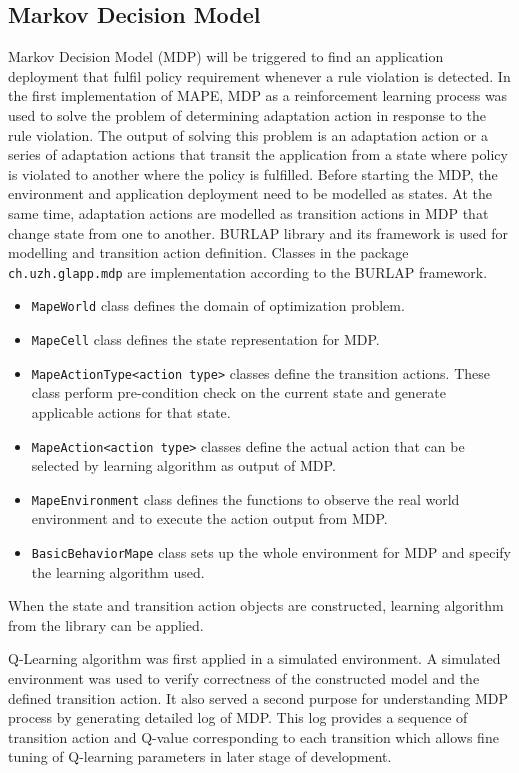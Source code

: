 \documentclass{seal_thesis}
\begin{document}
\subsection{Markov Decision Model}\label{sec:mdp}
Markov Decision Model (MDP) will be triggered to find an application deployment that fulfil policy requirement whenever a rule violation is detected.
In the first implementation of MAPE, MDP as a reinforcement learning process was used to solve the problem of determining adaptation action in response to the rule violation.
The output of solving this problem is an adaptation action or a series of adaptation actions that transit the application from a state where policy is violated to another where the policy is fulfilled.
Before starting the MDP, the environment and application deployment need to be modelled as states.
At the same time, adaptation actions are modelled as transition actions in MDP that change state from one to another.
BURLAP library and its framework is used for modelling and transition action definition.
Classes in the package \texttt{ch.uzh.glapp.mdp} are implementation according to the BURLAP framework. 
\begin{itemize}
\item \texttt{MapeWorld} class defines the domain of optimization problem.
\item \texttt{MapeCell} class defines the state representation for MDP.
\item \texttt{MapeActionType<action type>} classes define the transition actions.
These class perform pre-condition check on the current state and generate applicable actions for that state.
\item \texttt{MapeAction<action type>} classes define the actual action that can be selected by learning algorithm as output of MDP.
\item \texttt{MapeEnvironment} class defines the functions to observe the real world environment and to execute the action output from MDP.
\item \texttt{BasicBehaviorMape} class sets up the whole environment for MDP and specify the learning algorithm used.
\end{itemize}
When the state and transition action objects are constructed, learning algorithm from the library can be applied.

Q-Learning algorithm was first applied in a simulated environment.
A simulated environment was used to verify correctness of the constructed model and the defined transition action.
It also served a second purpose for understanding MDP process by generating detailed log of MDP.
This log provides a sequence of transition action and Q-value corresponding to each transition which allows fine tuning of Q-learning parameters in later stage of development.
\end{document}
